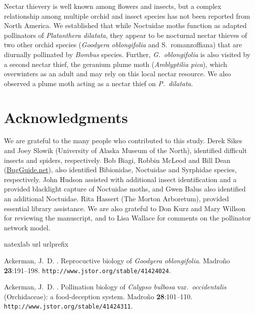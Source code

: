 \begin{multicols}{2}
Nectar thievery is well known among flowers and insects, but a complex
relationship among multiple orchid and insect species has not been
reported from North America. We established that while Noctuidae moths
function as adapted pollinators of \emph{Platanthera dilatata}, they
appear to be nocturnal nectar thieves of two other orchid species
(\emph{Goodyera oblongifolia} and S.\ romanzoffiana) that are diurnally
pollinated by \emph{Bombus} species. Further, \emph{G.\ oblongifolia} is
also visited by a second nectar thief, the geranium plume moth
(\emph{Amblyptilia pica}), which overwinters as an adult and may rely on
this local nectar resource. We also observed a plume moth acting as a
nectar thief on \emph{P.\ dilatata}.

\section{Acknowledgments}

We are grateful to the many people who contributed to this study. Derek
Sikes and Joey Slowik (University of Alaska Museum of the North),
identified difficult insects and spiders, respectively. Bob Biagi,
Robbin McLeod and Bill Dean (\href{https://bugguide.net/}{BugGuide.net}), also identified Bibionidae,
Noctuidae and Syrphidae species, respectively. John Hudson assisted
with additional insect identification and a provided blacklight capture
of Noctuidae moths, and Gwen Balus also identified an additional
Noctuidae. Rita Hassert (The Morton Arboretum), provided essential
library assistance. We are also grateful to Don Kurz and Mary Willson
for reviewing the manuscript, and to Lisa Wallace for comments on the
pollinator network model.

%

\begin{thebibliography}{27}
\expandafter\ifx\csname natexlab\endcsname\relax\def\natexlab#1{#1}\fi
\expandafter\ifx\csname url\endcsname\relax
  \def\url#1{{\tt #1}}\fi
\expandafter\ifx\csname urlprefix\endcsname\relax\def\urlprefix{{\small URL}
  }\fi

Ackerman, J.~D.
.
\newblock Reprocuctive biology of \emph{Goodyera oblongifolia}.
\newblock Madro\~{n}o {\bfseries 23}:191--198.
\newblock \urlprefix\url{http://www.jstor.org/stable/41424024}.

Ackerman, J.~D.
.
\newblock Pollination biology of \emph{Calypso bulbosa} var.\
  \emph{occidentalis} (Orchidaceae): a food-deception system.
\newblock Madro\~{n}o {\bfseries 28}:101--110.
\newblock \urlprefix\url{http://www.jstor.org/stable/41424311}.


\end{thebibliography}
\end{multicols}
